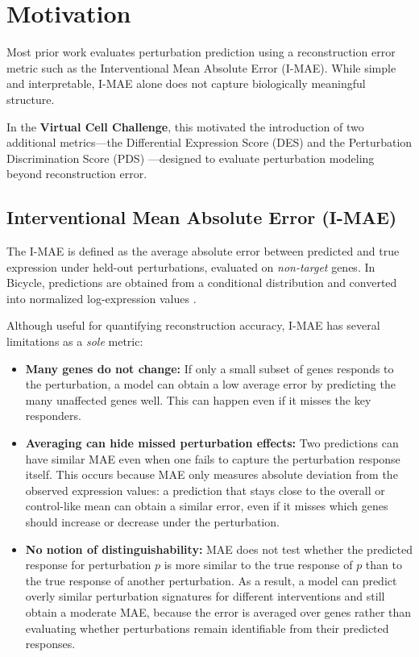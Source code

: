 \documentclass[12pt]{article}
\begin{document}
\section{Motivation}
Most prior work evaluates perturbation prediction using a reconstruction error metric such as the
Interventional Mean Absolute Error (I-MAE). While simple and interpretable, I-MAE alone does not
capture biologically meaningful structure.

In the \textbf{Virtual Cell Challenge}, this motivated the introduction of two additional metrics---the
Differential Expression Score (DES) and the Perturbation Discrimination Score (PDS) \cite{virtualcellchallenge_eval}---designed to evaluate perturbation modeling beyond reconstruction error.

\subsection{Interventional Mean Absolute Error (I-MAE)}
\label{sec:imae-def}
The I-MAE is defined as the average absolute error between predicted and true expression under
held-out perturbations, evaluated on \emph{non-target} genes. In Bicycle, predictions are obtained
from a conditional distribution and converted into normalized log-expression values
\cite{rohbeck2024bicycle}.

Although useful for quantifying reconstruction accuracy, I-MAE has several limitations as a \emph{sole}
metric:
\begin{itemize}
    \item \textbf{Many genes do not change:} If only a small subset of genes responds to the perturbation,
    a model can obtain a low average error by predicting the many unaffected genes well. This can happen even if it misses
    the key responders.

    \item \textbf{Averaging can hide missed perturbation effects:} 
    Two predictions can have similar MAE even when one fails to capture the perturbation response itself. This occurs because MAE only measures absolute deviation from the observed expression values: a prediction that stays close to the overall or control-like mean can obtain a similar error, even if it misses which genes should increase or decrease under the perturbation.

    \item \textbf{No notion of distinguishability:} MAE does not test whether the predicted response for perturbation \(p\) is more similar to the true response of \(p\) than to the true response of another perturbation. As a result, a model can predict overly similar perturbation signatures for different interventions and still obtain a moderate MAE, because the error is averaged over genes rather than evaluating whether perturbations remain identifiable from their predicted responses.
\end{itemize}
\end{document}

